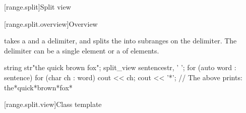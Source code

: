 \documentclass{wg21}
\begin{document}
[range.split]{Split view}

[range.split.overview]{Overview}

\pnum
{} takes a  and a delimiter, and splits
the  into subranges on the delimiter. The delimiter can be
a single element or a  of elements.

\pnum
\begin{example}
\begin{codeblock}
	string str{"the quick brown fox"};
	split_view sentence{str, ' '};
	for (auto word : sentence) {
		for (char ch : word)
		cout << ch;
		cout << '*';
	}
	// The above prints: the*quick*brown*fox*
\end{codeblock}
\end{example}

[range.split.view]{Class template }
\end{document}
